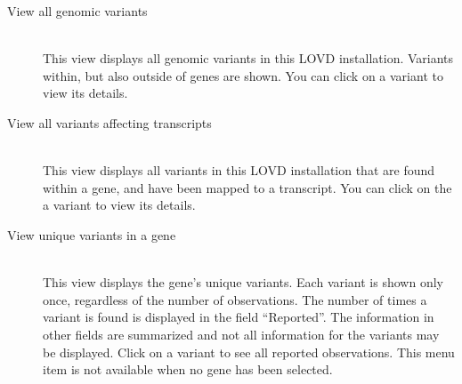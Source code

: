 \begin{description}
  \item [View all genomic variants] \hfill \\
  This view displays all genomic variants in this LOVD installation.
  Variants within, but also outside of genes are shown.
  You can click on a variant to view its details.
  \item [View all variants affecting transcripts] \hfill \\
  This view displays all variants in this LOVD installation that are found within a gene,
   and have been mapped to a transcript.
  You can click on the a variant to view its details.
  \item [View unique variants in a gene] \hfill \\
  This view displays the gene's unique variants.
  Each variant is shown only once, regardless of the number of observations.
  The number of times a variant is found is displayed in the field ``Reported''.
  The information in other fields are summarized and not all information for the variants may be displayed.
  Click on a variant to see all reported observations.
  This menu item is not available when no gene has been selected.
\end{description}

